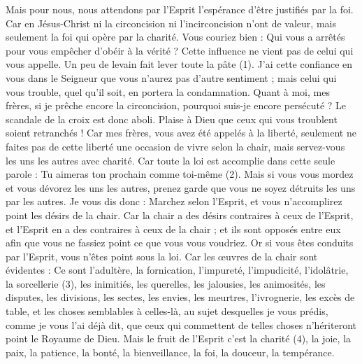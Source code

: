\begin{multicols}{2}
Mais pour nous, nous attendons par l'Esprit l’espérance d'être justifiés par la foi.
Car en Jésus-Christ ni la circoncision ni l’incirconcision n'ont de valeur, mais seulement la foi qui opère par la charité.
Vous couriez bien : Qui vous a arrêtés pour vous empêcher d'obéir à la vérité ?
Cette influence ne vient pas de celui qui vous appelle.
Un peu de levain fait lever toute la pâte (1).
J’ai cette confiance en vous dans le Seigneur que vous n'aurez pas d'autre sentiment ; mais celui qui vous trouble, quel qu'il soit, en portera la condamnation.
Quant à moi, mes frères, si je prêche encore la circoncision, pourquoi suis-je encore persécuté ? Le scandale de la croix est donc aboli.
Plaise à Dieu que ceux qui vous troublent soient retranchés !
Car mes frères, vous avez été appelés à la liberté, seulement ne faites pas de cette liberté une occasion de vivre selon la chair, mais servez-vous les uns les autres avec charité.
Car toute la loi est accomplie dans cette seule parole : Tu aimeras ton prochain comme toi-même (2).
Mais si vous vous mordez et vous dévorez les uns les autres, prenez garde que vous ne soyez détruits les uns par les autres.
Je vous dis donc : Marchez selon l'Esprit, et vous n’accomplirez point les désirs de la chair.
Car la chair a des désirs contraires à ceux de l'Esprit, et l'Esprit en a des contraires à ceux de la chair ; et ils sont opposés entre eux afin que vous ne fassiez point ce que vous vous voudriez.
Or si vous êtes conduits par l'Esprit, vous n'êtes point sous la loi.
Car les œuvres de la chair sont évidentes : Ce sont l'adultère, la fornication, l’impureté, l'impudicité,
l’idolâtrie, la sorcellerie (3), les inimitiés, les querelles, les jalousies, les animosités, les disputes, les divisions, les sectes,
les envies, les meurtres, l’ivrognerie, les excès de table, et les choses semblables à celles-là, au sujet desquelles je vous prédis, comme je vous l'ai déjà dit, que ceux qui commettent de telles choses n'hériteront point le Royaume de Dieu.
Mais le fruit de l'Esprit c’est la charité (4), la joie, la paix, la patience, la bonté, la bienveillance, la foi, la douceur, la tempérance.

\end{multicols}
